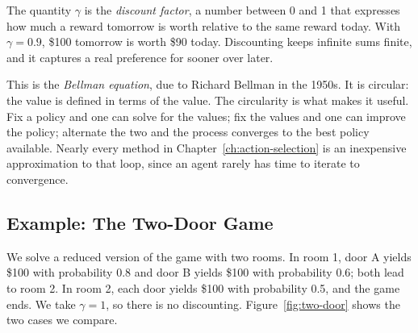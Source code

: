 \documentclass[11pt]{book}
\begin{document}
The quantity $\gamma$ is the \emph{discount factor}, a number between 0 and 1 that expresses how much a reward tomorrow is worth relative to the same reward today. With $\gamma = 0.9$, \$100 tomorrow is worth \$90 today. Discounting keeps infinite sums finite, and it captures a real preference for sooner over later.

This is the \emph{Bellman equation}, due to Richard Bellman in the 1950s. It is circular: the value is defined in terms of the value. The circularity is what makes it useful. Fix a policy and one can solve for the values; fix the values and one can improve the policy; alternate the two and the process converges to the best policy available. Nearly every method in Chapter~\ref{ch:action-selection} is an inexpensive approximation to that loop, since an agent rarely has time to iterate to convergence.

\subsection{Example: The Two-Door Game}

We solve a reduced version of the game with two rooms. In room 1, door A yields \$100 with probability 0.8 and door B yields \$100 with probability 0.6; both lead to room 2. In room 2, each door yields \$100 with probability 0.5, and the game ends. We take $\gamma = 1$, so there is no discounting. Figure~\ref{fig:two-door} shows the two cases we compare.
\end{document}
